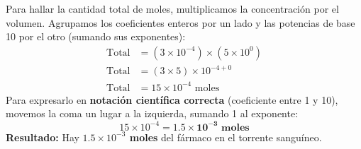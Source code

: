 \documentclass[12pt]{article}
\begin{document}
\begin{tcolorbox}
\begin{center}
\begin{tikzpicture}[scale=1]
    \end{tikzpicture}
    \end{center}

    \vspace{0.4cm}
    \begin{tcolorbox}[colback=medteal!10, colframe=medteal, arc=2mm, boxrule=1.2pt, title=\textbf{Desarrollo Matemático y Solución}]
        Para hallar la cantidad total de moles, multiplicamos la concentración por el volumen. Agrupamos los coeficientes enteros por un lado y las potencias de base 10 por el otro (sumando sus exponentes):
        \begin{align*}
            \text{Total} &= (3 \times 10^{-4}) \times (5 \times 10^0) \\[1ex]
            \text{Total} &= (3 \times 5) \times 10^{-4 + 0} \\[1ex]
            \text{Total} &= 15 \times 10^{-4} \text{ moles}
        \end{align*}
        Para expresarlo en \textbf{notación científica correcta} (coeficiente entre 1 y 10), movemos la coma un lugar a la izquierda, sumando 1 al exponente:
        \[ 15 \times 10^{-4} = \mathbf{1.5 \times 10^{-3} \text{ moles}} \]
        \textbf{Resultado:} Hay \textbf{$1.5 \times 10^{-3}$ moles} del fármaco en el torrente sanguíneo.
    \end{tcolorbox}
    
\end{tcolorbox}
\end{document}
